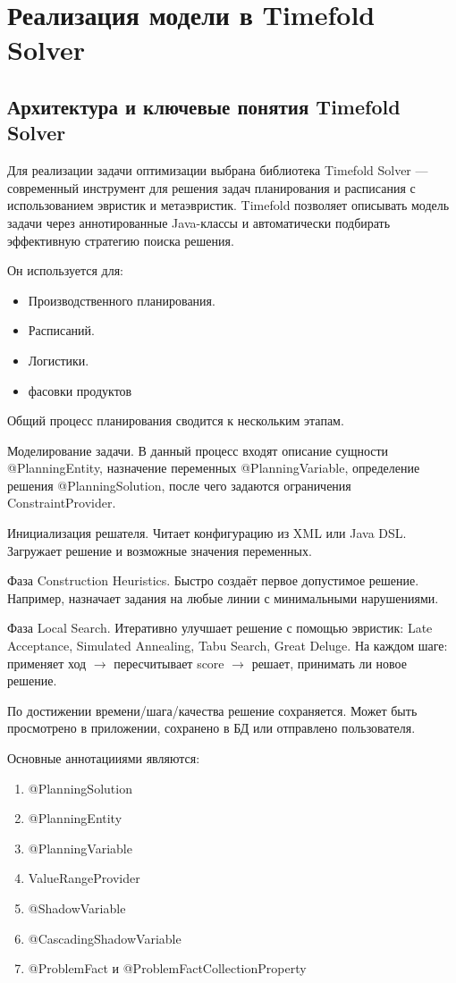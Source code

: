 \chapter{Реализация модели в Timefold Solver}
\label{ch:chapter3}

\section{Архитектура и ключевые понятия Timefold Solver}

Для реализации задачи оптимизации выбрана библиотека Timefold Solver — современный инструмент для решения задач планирования и расписания с использованием эвристик и метаэвристик. Timefold позволяет описывать модель задачи через аннотированные Java-классы и автоматически подбирать эффективную стратегию поиска решения.

Он используется для:
\begin{itemize}
    \item Производственного планирования.
    \item Расписаний.
    \item Логистики.
    \item фасовки продуктов
\end{itemize}

Общий процесс планирования сводится к нескольким этапам.

Моделирование задачи. В данный процесс входят описание сущности @PlanningEntity, назначение переменных @PlanningVariable, определение решения @PlanningSolution, после чего задаются ограничения ConstraintProvider.

Инициализация решателя. Читает конфигурацию из XML или Java DSL. Загружает решение и возможные значения переменных.

Фаза Construction Heuristics. Быстро создаёт первое допустимое решение. Например, назначает задания на любые линии с минимальными нарушениями.

Фаза Local Search. Итеративно улучшает решение с помощью эвристик: Late Acceptance, Simulated Annealing, Tabu Search, Great Deluge. На каждом шаге: применяет ход $\rightarrow$ пересчитывает score $\rightarrow$ решает, принимать ли новое решение.
 
По достижении времени/шага/качества решение сохраняется. Может быть просмотрено в приложении, сохранено в БД или отправлено пользователя.

Основные аннотацииями являются:

\begin{enumerate}
    \item @PlanningSolution
    \item @PlanningEntity
    \item @PlanningVariable
    \item ValueRangeProvider
    \item @ShadowVariable
    \item @CascadingShadowVariable
    \item @ProblemFact и @ProblemFactCollectionProperty
\end{enumerate}

